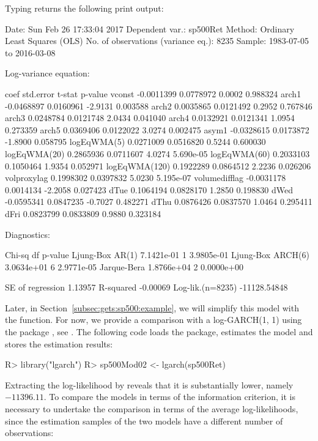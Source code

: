 \documentclass[article,nojss]{jss}
\begin{document}
%	
Typing  returns the following print output:
%
\begin{CodeChunk}
\begin{CodeOutput}
Date: Sun Feb 26 17:33:04 2017 
Dependent var.: sp500Ret 
Method: Ordinary Least Squares (OLS) 
No. of observations (variance eq.): 8235 
Sample: 1983-07-05 to 2016-03-08 

Log-variance equation:

                    coef  std.error  t-stat   p-value
vconst        -0.0011399  0.0778972  0.0002  0.988324
arch1         -0.0468897  0.0160961 -2.9131  0.003588
arch2          0.0035865  0.0121492  0.2952  0.767846
arch3          0.0248784  0.0121748  2.0434  0.041040
arch4          0.0132921  0.0121341  1.0954  0.273359
arch5          0.0369406  0.0122022  3.0274  0.002475
asym1         -0.0328615  0.0173872 -1.8900  0.058795
logEqWMA(5)    0.0271009  0.0516820  0.5244  0.600030
logEqWMA(20)   0.2865936  0.0711607  4.0274 5.690e-05
logEqWMA(60)   0.2033103  0.1050464  1.9354  0.052971
logEqWMA(120)  0.1922289  0.0864512  2.2236  0.026206
volproxylag    0.1998302  0.0397832  5.0230 5.195e-07
volumedifflag -0.0031178  0.0014134 -2.2058  0.027423
dTue           0.1064194  0.0828170  1.2850  0.198830
dWed          -0.0595341  0.0847235 -0.7027  0.482271
dThu           0.0876426  0.0837570  1.0464  0.295411
dFri           0.0823799  0.0833809  0.9880  0.323184

Diagnostics:

                      Chi-sq df    p-value
Ljung-Box AR(1)   7.1421e-01  1 3.9805e-01
Ljung-Box ARCH(6) 3.0634e+01  6 2.9771e-05
Jarque-Bera       1.8766e+04  2 0.0000e+00

SE of regression      1.13957
R-squared            -0.00069
Log-lik.(n=8235) -11128.54848
\end{CodeOutput}
\end{CodeChunk}
%
Later, in Section~\ref{subsec:gets:sp500:example}, we will simplify
this model with the  function. For now, we provide a
comparison with a log-GARCH(1, 1) using the  package
, see \cite{Sucarrat2015lgarchV06}. The following code
loads the package, estimates the model and stores the estimation
results:
%
\begin{CodeChunk}
\begin{CodeInput}
R> library("lgarch")
R> sp500Mod02 <- lgarch(sp500Ret)
\end{CodeInput}
\end{CodeChunk}
%
Extracting the log-likelihood by  reveals that it is substantially lower, namely $-11396.11$. To compare the models in terms of the \cite{Schwarz1978} information criterion, it is necessary to undertake the comparison in terms of the average log-likelihoods, since the estimation samples of the two models have a different number of observations:
\end{document}
